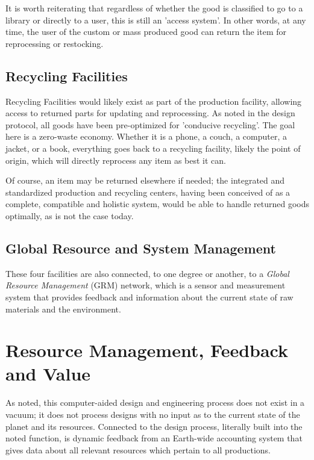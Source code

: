 \documentclass[10pt, a4paper, cleardoubleempty, openright, twoside]{book}
\begin{document}
It is worth reiterating that regardless of whether the good is
classified to go to a library or directly to a user, this is still an
'access system'. In other words, at any time, the user of the custom or
mass produced good can return the item for reprocessing or restocking. 


\subsection {Recycling Facilities}

Recycling Facilities would likely exist as part of the production
facility, allowing access to returned parts for updating and
reprocessing. As noted in the design protocol, all goods have been
pre-optimized for 'conducive recycling'. The goal here is a zero-waste
economy. Whether it is a phone, a couch, a computer, a jacket, or a
book, everything goes back to a recycling facility, likely the point of
origin, which will directly reprocess any item as best it can. 

Of course, an item may be returned elsewhere if needed; the integrated
and standardized production and recycling centers, having been conceived
of as a complete, compatible and holistic system, would be able to
handle returned goods optimally, as is not the case today. 


\subsection {Global Resource and System Management}

These four facilities are also connected, to one degree or another, to a
\emph{Global Resource Management } (GRM) network, which is a sensor and
measurement system that provides feedback and information about the
current state of raw materials and the environment. 

\section {Resource Management, Feedback and Value}

As noted, this computer-aided design and engineering process does not
exist in a vacuum; it does not process designs with no input as to the
current state of the planet and its resources. Connected to the design
process, literally built into the noted  function, is dynamic feedback from an Earth-wide accounting system that gives data about all relevant resources which pertain to all productions. 
\end{document}
